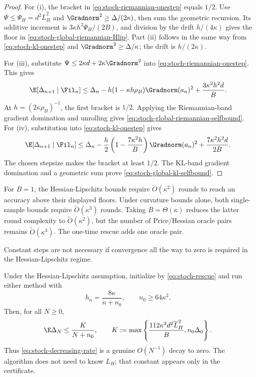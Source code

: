 \begin{proof}
For (i), the bracket in
\eqref{eq:stoch-riemannian-onestep} equals \(1/2\).  Use
\(\Psi\leq\Psi_H=d^2\overline L_H^2\) and
\(\Gradnorm^2\geq\Delta/(2\kappa)\), then sum the geometric recursion.
Its additive increment is \(3\kappa h^2\Psi_H/(2B)\), and division by the
drift \(h/(4\kappa)\) gives the floor in
\eqref{eq:stoch-global-riemannian-Hlip}.  Part (ii) follows in the same way
from \eqref{eq:stoch-kl-onestep} and
\(\Gradnorm^2\geq\Delta/\kappa\); the drift is
\(h/(2\kappa)\).

For (iii), substitute
\(\Psi\leq2\kappa d+2\kappa\Gradnorm^2\) into
\eqref{eq:stoch-riemannian-onestep}.  This gives
\[
  \E[\Delta_{n+1}\mid\Fil_n]
  \leq\Delta_n-h(1-\kappa h\rho_B)\Gradnorm(a_n)^2
  +\frac{3\kappa^2h^2d}{B}.
\]
At \(h=(2\kappa\rho_B)^{-1}\), the first bracket is \(1/2\).  Applying
the Riemannian-band gradient domination and unrolling gives
\eqref{eq:stoch-global-riemannian-selfbound}.  For (iv), substitution into
\eqref{eq:stoch-kl-onestep} gives
\[
  \E[\Delta_{n+1}\mid\Fil_n]
  \leq\Delta_n
  -\frac h2\left(1-\frac{7\kappa^2h}{B}\right)\Gradnorm(a_n)^2
  +\frac{7\kappa^2h^2d}{2B}.
\]
The chosen stepsize makes the bracket at least \(1/2\).  The KL-band
gradient domination and a geometric sum prove
\eqref{eq:stoch-global-kl-selfbound}.
\end{proof}

For \(B=1\), the Hessian-Lipschitz bounds require
\(\widetilde O(\kappa^2)\) rounds to reach an accuracy above their displayed
floors.  Under curvature bounds alone, both single-sample bounds require
\(\widetilde O(\kappa^3)\) rounds.  Taking
\(B=\Theta(\kappa)\) reduces the latter round complexity to
\(\widetilde O(\kappa^2)\), but the number of Price/Hessian oracle pairs
remains \(\widetilde O(\kappa^3)\).  The one-time rescue adds one oracle
pair.

Constant steps are not necessary if convergence all the way to zero is
required in the Hessian-Lipschitz regime.

\begin{theorem}
\label{thm:stoch-global-decreasing}
Under the Hessian-Lipschitz assumption, initialize by
\eqref{eq:stoch-rescue} and run either method with
\begin{equation}
  h_n=\frac{8\kappa}{n+n_0},
  \qquad n_0\geq64\kappa^2.
  \label{eq:stoch-decreasing-schedule}
\end{equation}
Then, for all \(N\geq0\),
\begin{equation}
  \E\Delta_N\leq\frac K{N+n_0},
  \qquad
  K:=\max\left\{
    \frac{112\kappa^3d^2\overline L_H^2}{B},
    n_0\Delta_0
  \right\}.
  \label{eq:stoch-decreasing-rate}
\end{equation}
Thus \eqref{eq:stoch-decreasing-rate} is a genuine \(O(N^{-1})\) decay to
zero.  The algorithm does not need to know \(L_H\); that constant appears
only in the certificate.
\end{theorem}

